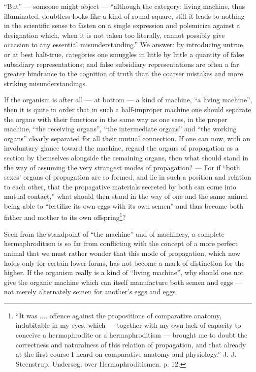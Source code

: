 \documentclass[12pt,a4paper]{book}
\begin{document}
``But'' --- someone might object --- ``although the category: living machine, thus
illuminated, doubtless looks like a kind of round square, still it leads to nothing
in the scientific sense to fasten on a single expression and polemicize against a
designation which, when it is not taken too literally, cannot possibly give occasion
to any essential misunderstanding.'' We answer: by introducing untrue, or at best
half-true, categories one smuggles in little by little a quantity of false
subsidiary representations; and false subsidiary representations are often a far
greater hindrance to the cognition of truth than the coarser mistakes and more
striking misunderstandings.

\setcounter{footnote}{0}

If the organism is after all --- at bottom --- a kind of machine, ``a living
machine'', then it is quite in order that in such a half-improper machine one should
separate the organs with their functions in the same way as one sees, in the proper
machine, ``the receiving organs'', ``the intermediate organs'' and ``the working
organs'' clearly separated for all their mutual connection. If one can now, with an
involuntary glance toward the machine, regard the organs of propagation as a section
by themselves alongside the remaining organs, then what should stand in the way of
assuming the very strangest modes of propagation? --- For if ``both sexes' organs of
propagation are so formed, and lie in such a position and relation to each other,
that the propagative materials secreted by both can come into mutual contact,'' what
should then stand in the way of one and the same animal being able to ``fertilize its
own eggs with its own semen'' and thus become both father and mother to its own
offspring\footnote{``It was .... offence against the propositions of comparative
anatomy, indubitable in my eyes, which --- together with my own lack of capacity to
conceive a hermaphrodite or a hermaphroditism --- brought me to doubt the correctness
and naturalness of this relation of propagation, and that already at the first course
I heard on comparative anatomy and physiology.'' J. J. Steenstrup. Undersøg. over
Hermaphroditismen. p. 12.}?

Seen from the standpoint of ``the machine'' and of machinery, a complete
hermaphroditism is so far from conflicting with the concept of a more perfect animal
that we must rather wonder that this mode of propagation, which now holds only for
certain lower forms, has not become a mark of distinction for the higher. If the
organism really is a kind of ``living machine'', why should one not give the organic
machine which can itself manufacture both semen and eggs --- not merely alternately
semen for another's eggs and eggs
\end{document}
